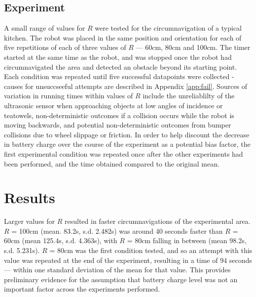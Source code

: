 \documentclass[a4paper,12pt]{article}
\begin{document}
\subsection{Experiment}
A small range of values for $R$ were tested for the circumnavigation of a typical kitchen. The robot was placed in the same position and orientation for each of five repetitions of each of three values of $R$ --- 60cm, 80cm and 100cm. The timer started at the same time as the robot, and was stopped once the robot had circumnavigated the area and detected an obstacle beyond its starting point. Each condition was repeated until five successful datapoints were collected - causes for unsuccseeful attempts are described in Appendix \ref{app:fail}.
Sources of variation in running times within values of $R$ include the unreliablilty of the ultrasonic sensor when approaching objects at low angles of incidence or teatowels, non-deterministic outcomes if a collision occurs while the robot is moving backwards, and potential non-deterministic outcomes from bumper collisions due to wheel slippage or friction. In order to help discount the decrease in battery charge over the course of the experiment as a potential bias factor, the first experimental condition was repeated once after the other experiments had been performed, and the time obtained compared to the original mean.


\section{Results}


Larger values for $R$ resulted in faster circumnavigations of the experimental area. $R$ = 100cm (mean. 83.2s, s.d. 2.482s) was around 40 seconds faster than $R$ = 60cm (mean 125.4s, s.d. 4.363s), with $R$ = 80cm falling in between (mean 98.2s, s.d. 5.231s). $R$ = 80cm was the first condition tested, and so an attempt with this value was repeated at the end of the experiment, resulting in a time of 94 seconds --- within one standard deviation of the mean for that value. This provides preliminary evidence for the assumption that battery charge level was not an important factor across the experiments performed.
\end{document}
